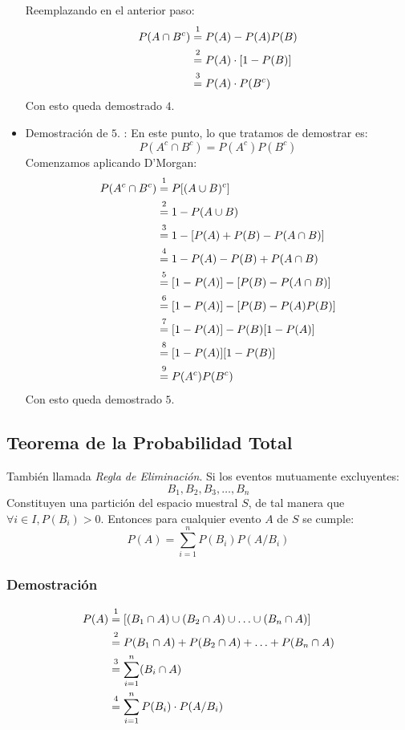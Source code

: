 \begin{itemize}
Reemplazando en el anterior paso:
\begin{align*}
P(A \cap B^c) &\varstackrel{1}{=} P(A)-P(A)P(B) \\
&\varstackrel{2}{=} P(A)\cdot [1-P(B)]  \\
&\varstackrel{3}{=} P(A)\cdot P(B^c)
\end{align*}
Con esto queda demostrado $4$.
\item Demostración de $5.$ :
En este punto, lo que tratamos de demostrar es: 
$$P(A^c \cap B^c)=P(A^c)P(B^c)$$
Comenzamos aplicando D'Morgan:
\begin{align*}
P(A^c \cap B^c) &\varstackrel{1}{=} P[(A\cup B)^c] \\
&\varstackrel{2}{=} 1-P(A\cup B) \\
&\varstackrel{3}{=} 1-[P(A)+P(B)-P(A\cap B)]\\
&\varstackrel{4}{=} 1-P(A)-P(B)+P(A\cap B) \\
&\varstackrel{5}{=} [1-P(A)]-[P(B)-P(A\cap B)]\\ 
&\varstackrel{6}{=} [1-P(A)]-[P(B)-P(A)P(B)]\\
&\varstackrel{7}{=} [1-P(A)]-P(B)[1-P(A)]\\
&\varstackrel{8}{=} [1-P(A)][1-P(B)]\\
&\varstackrel{9}{=} P(A^c)P(B^c)
\end{align*}
Con esto queda demostrado $5$.
\end{itemize}
\subsection{Teorema de la Probabilidad Total}
También llamada \textit{Regla de Eliminación}. Si los eventos mutuamente excluyentes:
$$B_1,B_2,B_3,\ldots,B_n$$
Constituyen una partición del espacio muestral $S$, de tal manera que $\forall i\in I,P(B_i)>0$. Entonces para cualquier evento $A$ de $S$ se cumple:
$$P(A)=\displaystyle\sum_{i=1}^{n} P(B_i)P(A/B_i)$$
\subsubsection{Demostración}
\begin{align*}
P(A) &\varstackrel{1}{=} [(B_1\cap A)\cup (B_2\cap A)\cup \ldots \cup (B_n\cap A)] \\
&\varstackrel{2}{=} P(B_1\cap A)+P(B_2\cap A)+ \ldots + P(B_n\cap A) \\
&\varstackrel{3}{=} \displaystyle\sum_{i=1}^{n}(B_i \cap A) \\
&\varstackrel{4}{=} \displaystyle\sum_{i=1}^{n} P(B_i)\cdot P(A/B_i) 
\end{align*}
